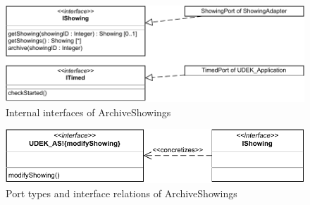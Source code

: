 \documentclass[a4paper,10pt,titlepage,bibtotoc,bibtotocnumbered]{scrreprt}
\begin{document}
\begin{figure}[H]
\centering
\includegraphics[width = \textwidth]{figures/08/A08_Archive-Internal Interfaces.drawio.pdf}
\caption{Internal interfaces of ArchiveShowings}
\label{figure:ArchiveShowings_internal_interfaces}
\end{figure}

\begin{figure}[H]
\centering
\includegraphics[width = \textwidth]{figures/08/A08_Archive-Port Types.drawio.pdf}
\caption{Port types and interface relations of ArchiveShowings}
\label{figure:ArchiveShowings_port_types}
\end{figure}
\end{document}
